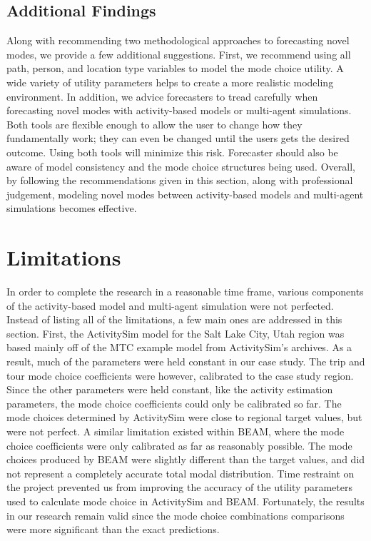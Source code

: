 \documentclass[12pt, oneside, openright]{byuthesis}
\begin{document}
\hypertarget{additional-findings}{%
\section{Additional Findings}\label{additional-findings}}

Along with recommending two methodological approaches to forecasting novel modes, we provide a few additional suggestions. First, we recommend using all path, person, and location type variables to model the mode choice utility. A wide variety of utility parameters helps to create a more realistic modeling environment. In addition, we advice forecasters to tread carefully when forecasting novel modes with activity-based models or multi-agent simulations. Both tools are flexible enough to allow the user to change how they fundamentally work; they can even be changed until the users gets the desired outcome. Using both tools will minimize this risk. Forecaster should also be aware of model consistency and the mode choice structures being used. Overall, by following the recommendations given in this section, along with professional judgement, modeling novel modes between activity-based models and multi-agent simulations becomes effective.

\hypertarget{limitations}{%
\chapter{Limitations}\label{limitations}}

In order to complete the research in a reasonable time frame, various components of the activity-based model and multi-agent simulation were not perfected. Instead of listing all of the limitations, a few main ones are addressed in this section. First, the ActivitySim model for the Salt Lake City, Utah region was based mainly off of the MTC example model from ActivitySim's archives. As a result, much of the parameters were held constant in our case study. The trip and tour mode choice coefficients were however, calibrated to the case study region. Since the other parameters were held constant, like the activity estimation parameters, the mode choice coefficients could only be calibrated so far. The mode choices determined by ActivitySim were close to regional target values, but were not perfect. A similar limitation existed within BEAM, where the mode choice coefficients were only calibrated as far as reasonably possible. The mode choices produced by BEAM were slightly different than the target values, and did not represent a completely accurate total modal distribution. Time restraint on the project prevented us from improving the accuracy of the utility parameters used to calculate mode choice in ActivitySim and BEAM. Fortunately, the results in our research remain valid since the mode choice combinations comparisons were more significant than the exact predictions.
\end{document}
